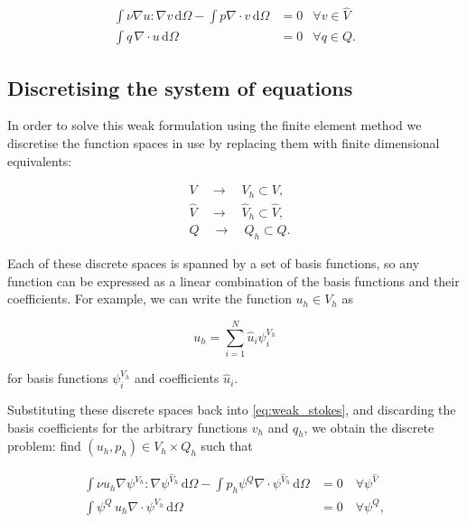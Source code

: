 \documentclass[thesis]{subfiles}
\begin{document}
\begin{subequations}
  \begin{align}
    \int \nu \nabla u : \nabla v \, \textrm{d}\Omega
    - \int p \nabla \cdot v \, \textrm{d}\Omega
    &= 0
    &\forall v \in \hat V
    \label{eq:weak_stokes_V} \\
    \int q \, \nabla \cdot u \, \textrm{d}\Omega
    &= 0
    &\forall q \in Q.
    \label{eq:weak_stokes_Q}
  \end{align}
  \label{eq:weak_stokes}
\end{subequations}

\subsection{Discretising the system of equations}

In order to solve this weak formulation using the finite element method we discretise the function spaces in use by replacing them with finite dimensional equivalents:

\begin{align*}
  &V \quad \to \quad V_h \subset V, \\
  &\hat V \quad \to \quad \hat V_h \subset \hat V, \\
  &Q \quad \to \quad Q_h \subset Q.
\end{align*}

Each of these discrete spaces is spanned by a set of basis functions, so any function can be expressed as a linear combination of the basis functions and their coefficients.
For example, we can write the function $u_h \in V_h$ as

\begin{equation}
  u_h = \sum^N_{i=1} \hat u_i \psi^{V_h}_i
\end{equation}

for basis functions $\psi^{V_h}_i$ and coefficients $\hat u_i$.

Substituting these discrete spaces back into \cref{eq:weak_stokes}, and discarding the basis coefficients for the arbitrary functions $v_h$ and $q_h$, we obtain the discrete problem: find $(u_h, p_h) \in V_h \times Q_h$ such that

\begin{subequations}
  \begin{align}
    \int \nu u_h \nabla \psi^{V_h} : \nabla \psi^{\hat V_h} \, \textrm{d}\Omega
    - \int p_h \psi^Q \nabla \cdot \psi^{\hat V_h} \, \textrm{d}\Omega
    &= 0
    \quad \forall \psi^{\hat V} \\
    \int \psi^Q \, u_h \nabla \cdot \psi^{V_h} \, \textrm{d}\Omega
    &= 0
    \quad \forall \psi^{Q},
  \end{align}
  \label{eq:weak_stokes_discrete}
\end{subequations}
\end{document}
